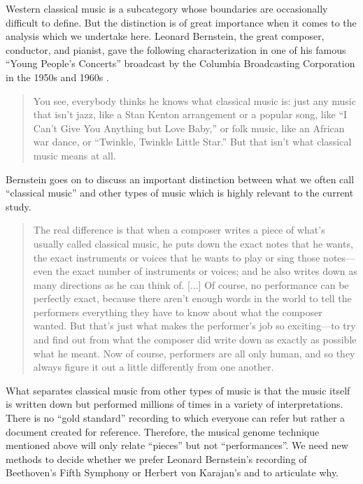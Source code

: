 \documentclass[12pt]{article}
\begin{document}
Western classical music is a subcategory
whose boundaries are occasionally difficult to define. But
the distinction is of great importance when it comes to the analysis
which we undertake here. Leonard Bernstein, the great composer,
conductor, and pianist, gave the following characterization in one of his famous
``Young People's Concerts''
broadcast by the Columbia Broadcasting Corporation in the 1950s and
1960s \citep{Bernstein2005}.
\begin{quote}
  You see, everybody thinks he knows what classical music is: just any music that isn't jazz,
  like a Stan Kenton arrangement or a popular song, like ``I Can't Give
  You Anything but Love Baby,'' or folk music, like an African war
  dance, or ``Twinkle, Twinkle Little Star.'' But that isn't what
  classical music means at all.
\end{quote}
Bernstein goes on to discuss an important distinction between what
we often call ``classical music'' and other types of music which is
highly relevant to the current study.
\begin{quote}
  The real difference is that when a composer
  writes a piece of what's usually called classical music, he puts down
  the exact notes that he wants, the exact instruments or voices that he
  wants to play or sing those notes---even the exact number of
  instruments or voices; and he also writes down as many directions as
  he can think of. [...] Of course, no performance can be perfectly exact, because there
  aren't enough words in the world to tell the performers everything
  they have to know about what the composer wanted. But that's just what
  makes the performer's job so exciting---to try and find out from what
  the composer did write down as exactly as possible what he meant. Now
  of course, performers are all only human, and so they always figure it
  out a little differently from one another.  
\end{quote}
What separates classical music from other types of music is that the
music itself is written down but performed millions of times in a
variety of interpretations. There is no ``gold standard'' recording to
which everyone can refer but rather a document created for
reference. Therefore, the musical genome technique mentioned above
will only relate ``pieces'' but not ``performances''. We need
new methods to decide whether we prefer Leonard Bernstein's
recording of Beethoven's Fifth Symphony or Herbert von Karajan's and
to articulate why.
\end{document}
